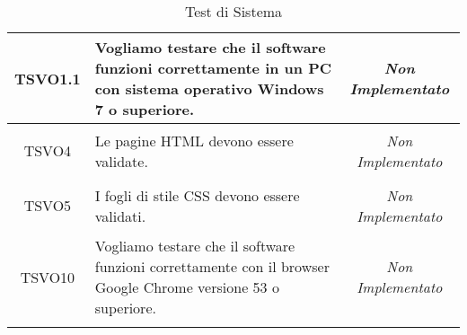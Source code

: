\begin{longtable}{|c|>{}m{8cm}|c|}
\hypertarget{TSVO1.1}{TSVO1.1} & Vogliamo testare che il software funzioni correttamente in un PC con sistema operativo Windows 7 o superiore.
 & \textit{Non Implementato}\\ \hline
\hypertarget{TSVO4}{TSVO4} & Le pagine HTML devono essere validate. & \textit{Non Implementato}\\ \hline
\hypertarget{TSVO5}{TSVO5} & I fogli di stile CSS devono essere validati. & \textit{Non Implementato}\\ \hline
\hypertarget{TSVO10}{TSVO10} & Vogliamo testare che il software funzioni correttamente con il browser Google Chrome versione 53 o superiore. & \textit{Non Implementato}\\ \hline
\caption[Test di Sistema]{Test di Sistema}
\label{tabella:test1}
\end{longtable}
\clearpage

